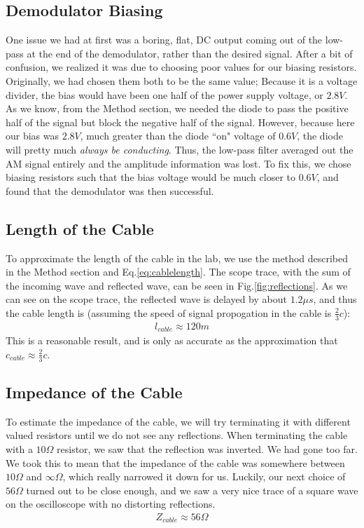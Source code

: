 \documentclass[12pt]{article}
\begin{document}
\subsection*{Demodulator Biasing}
One issue we had at first was a boring, flat, DC output coming out of the low-pass at the end of the demodulator, rather than the desired signal. After a bit of confusion, we realized it was due to choosing poor values for our biasing resistors. Originally, we had chosen them both to be the same value; Because it is a voltage divider, the bias would have been one half of the power supply voltage, or $2.8V$. As we know, from the Method section, we needed the diode to pass the positive half of the signal but block the negative half of the signal. However, because here our bias was $2.8V$, much greater than the diode ``on" voltage of $0.6V$, the diode will pretty much \textit{always be conducting}. Thus, the low-pass filter averaged out the AM signal entirely and the amplitude information was lost. To fix this, we chose biasing resistors such that the bias voltage would be much closer to $0.6V$, and found that the demodulator was then successful.

\subsection*{Length of the Cable}
To approximate the length of the cable in the lab, we use the method described in the Method section and Eq.\ref{eq:cablelength}. The scope trace, with the sum of the incoming wave and reflected wave, can be seen in Fig.\ref{fig:reflections}. As we can see on the scope trace, the reflected wave is delayed by about $1.2\mu s$, and thus the cable length is (assuming the speed of signal propogation in the cable is $\frac{2}{3}c$):
\begin{eqnarray}
l_{cable} \approx 120m \nonumber
\end{eqnarray}
This is a reasonable result, and is only as accurate as the approximation that $c_{cable} \approx \frac{2}{3}c$.

\subsection*{Impedance of the Cable}
To estimate the impedance of the cable, we will try terminating it with different valued resistors until we do not see any reflections. When terminating the cable with a $10\Omega$ resistor, we saw that the reflection was inverted. We had gone too far. We took this to mean that the impedance of the cable was somewhere between $10\Omega$ and $\infty\Omega$, which really narrowed it down for us. Luckily, our next choice of $56\Omega$ turned out to be close enough, and we saw a very nice trace of a square wave on the oscilloscope with no distorting reflections.
\begin{eqnarray}
Z_{cable} \approx 56\Omega \nonumber
\end{eqnarray}
\end{document}
